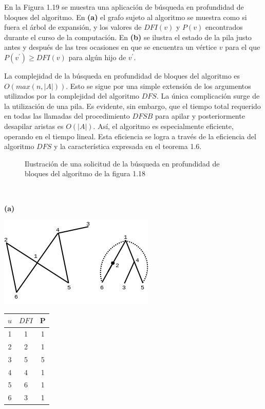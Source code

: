 \documentclass[10pt,a5paper]{book}
\begin{document}
En la Figura 1.19 se muestra una aplicación de búsqueda en profundidad de bloques del algoritmo. En \textbf{(a)} el grafo sujeto al algoritmo se muestra como si fuera el árbol de expansión, y los valores de $DFI(v)$ y $P(v)$ encontrados durante el curso de la computación. En \textbf{(b)} se ilustra el estado de la pila justo antes y después de las tres ocasiones en que se encuentra un vértice $v$ para el que $P(v^{'}) \ge DFI(v)$ para algún hijo de $v^{'}$.

La complejidad de la búsqueda en profundidad de bloques del algoritmo es $O(max(n,|A|))$. Esto se sigue por una simple extensión de los argumentos utilizados por la complejidad del algoritmo $DFS$. La única complicación surge de la utilización de una pila. Es evidente, sin embargo, que el tiempo total requerido en todas las llamadas del procedimiento $DFSB$ para apilar y posteriormente desapilar aristas es $O(|A|)$. Así, el algoritmo es especialmente eficiente, operando en el tiempo lineal. Esta eficiencia se logra a través de la eficiencia del algoritmo $DFS$ y la característica expresada en el teorema 1.6.
\vfill
\pagebreak
\begin{figure}[H]
\caption{Ilustración de una solicitud de la búsqueda en profundidad de bloques del algoritmo de la figura 1.18}
\end{figure}
\hrulefill{}\\
\begin{center}
\parbox{2cm}
{
  \begin{flushleft}\textbf{(a)}\end{flushleft}
  \includegraphics[scale=0.45]{Fig1_19_a.png}
}\hfill
\parbox{4cm}
{
  \begin{flushright}
  \begin{tabular}{|c|c|c|}
  \hline
  $u$ & $DFI$ & P\\
  \hline
  1 & 1 & 1 \\
  \hline
  2 & 2 & 1 \\
  \hline
  3 & 5 & 5 \\
  \hline
  4 & 4 & 1 \\
  \hline
  5 & 6 & 1 \\
  \hline
  6 & 3 & 1 \\
  \hline
\end{tabular}
\end{flushright}
}\\
\end{center}
\end{document}

